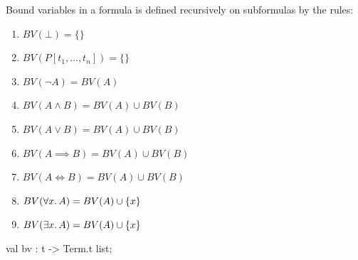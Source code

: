 \begin{node}
Bound variables in  a formula is defined recursively on subformulas by
the rules:
\begin{enumerate}
\item $BV(\bot)=\{\}$
\item $BV(P[t_{1},\dots,t_{n}])=\{\}$
\item $BV(\neg A)=BV(A)$
\item $BV(A\land B)=BV(A)\cup BV(B)$
\item $BV(A\lor B)=BV(A)\cup BV(B)$
\item $BV(A\implies B)=BV(A)\cup BV(B)$
\item $BV(A\iff B)=BV(A)\cup BV(B)$
\item $BV(\forall x\ldotp A)=BV(A)\cup\{x\}$
\item $BV(\exists x\ldotp A)=BV(A)\cup\{x\}$
\end{enumerate}
\end{node}
\nwenddocs{}\plusendmoddef\nwstartdeflinemarkup{}\nwenddeflinemarkup
val bv : t -> Term.t list;
\nwendcode{}\nwdocspar


